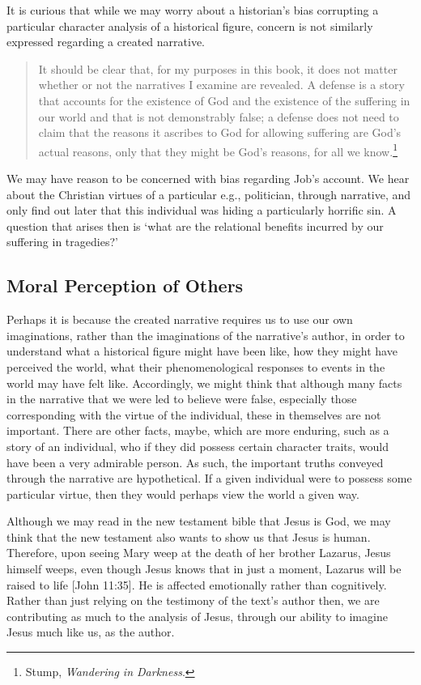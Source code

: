 \documentclass[phdthesis,12pt,final]{wuthesis}
\theoremstyle{definition}
\theoremstyle{definition}
\theoremstyle{definition}
\theoremstyle{definition}
\theoremstyle{remark}
\begin{document}
It is curious that while we may worry about a historian's bias corrupting a particular character analysis of a historical figure, concern is not similarly expressed regarding a created narrative.

\begin{quote}
It should be clear that, for my purposes in this book, it does not matter whether or not the narratives I examine are revealed. A defense is a story that accounts for the existence of God and the existence of the suffering in our world and that is not demonstrably false; a defense does not need to claim that the reasons it ascribes to God for allowing suffering are God's actual reasons, only that they might be God's reasons, for all we know.\footnote{Stump, \emph{Wandering in {Darkness}}.}
\end{quote}

We may have reason to be concerned with bias regarding Job's account. We hear about the Christian virtues of a particular e.g., politician, through narrative, and only find out later that this individual was hiding a particularly horrific sin. A question that arises then is `what are the relational benefits incurred by our suffering in tragedies?'

\subsection*{Moral Perception of Others}\label{moral-perception-of-others-1}

Perhaps it is because the created narrative requires us to use our own imaginations, rather than the imaginations of the narrative's author, in order to understand what a historical figure might have been like, how they might have perceived the world, what their phenomenological responses to events in the world may have felt like. Accordingly, we might think that although many facts in the narrative that we were led to believe were false, especially those corresponding with the virtue of the individual, these in themselves are not important. There are other facts, maybe, which are more enduring, such as a story of an individual, who if they did possess certain character traits, would have been a very admirable person. As such, the important truths conveyed through the narrative are hypothetical. If a given individual were to possess some particular virtue, then they would perhaps view the world a given way.

Although we may read in the new testament bible that Jesus is God, we may think that the new testament also wants to show us that Jesus is human. Therefore, upon seeing Mary weep at the death of her brother Lazarus, Jesus himself weeps, even though Jesus knows that in just a moment, Lazarus will be raised to life {[}John 11:35{]}. He is affected emotionally rather than cognitively. Rather than just relying on the testimony of the text's author then, we are contributing as much to the analysis of Jesus, through our ability to imagine Jesus much like us, as the author.
\end{document}
